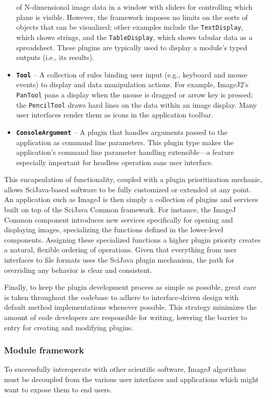 \documentclass{bmcart}
\begin{document}
\begin{itemize}
    of N-dimensional image data in a window with sliders for controlling which
    plane is visible. However, the framework imposes no limits on the sorts of
    objects that can be visualized; other examples include the
    \texttt{TextDisplay}, which shows strings, and the \texttt{TableDisplay},
    which shows tabular data as a spreadsheet. These plugins are typically used
    to display a module's typed outputs (i.e., its results).
  \item \textbf{\texttt{Tool}} -- A collection of rules binding user input
    (e.g., keyboard and mouse events) to display and data manipulation actions.
    For example, ImageJ2's \texttt{PanTool} pans a display when the mouse is
    dragged or arrow key is pressed; the \texttt{PencilTool} draws hard lines
    on the data within an image display. Many user interfaces render them as
    icons in the application toolbar.
  \item \textbf{\texttt{ConsoleArgument}} -- A plugin that handles arguments
    passed to the application as command line parameters. This plugin type
    makes the application's command line parameter handling extensible---a
    feature especially important for headless operation sans user interface.
\end{itemize}

This encapsulation of functionality, coupled with a plugin prioritization
mechanic, allows SciJava-based software to be fully customized or extended at
any point. An application such as ImageJ is then simply a collection of plugins
and services built on top of the SciJava Common framework. For instance, the
ImageJ Common \cite{imagej_common} component introduces new services
specifically for opening and displaying images, specializing the functions
defined in the lower-level components. Assigning these specialized functions a
higher plugin priority creates a natural, flexible ordering of operations.
Given that everything from user interfaces to file formats uses the SciJava
plugin mechanism, the path for overriding any behavior is clear and consistent.

Finally, to keep the plugin development process as simple as possible, great
care is taken throughout the codebase to adhere to interface-driven design with
default method implementations whenever possible. This strategy minimizes the
amount of code developers are responsible for writing, lowering the barrier to
entry for creating and modifying plugins.

\subsubsection*{Module framework}
To successfully interoperate with other scientific software, ImageJ algorithms
must be decoupled from the various user interfaces and applications which might
want to expose them to end users.
\end{document}
